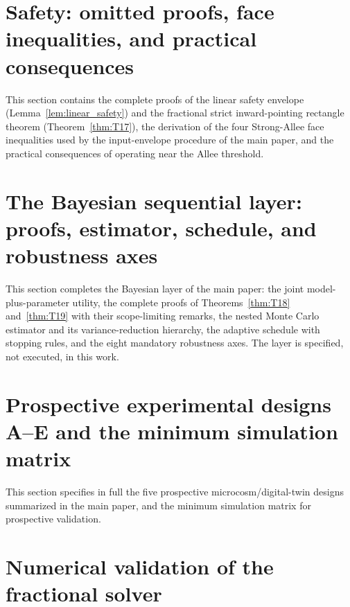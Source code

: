 \documentclass[9pt]{extarticle}
\begin{document}


\section{Safety: omitted proofs, face inequalities, and practical consequences}
\label{ssec:safety}

This section contains the complete proofs of the linear safety envelope
(Lemma~\ref{lem:linear_safety}) and the fractional strict inward-pointing rectangle theorem
(Theorem~\ref{thm:T17}), the derivation of the four Strong-Allee face inequalities used by
the input-envelope procedure of the main paper, and the practical consequences of operating
near the Allee threshold.



\section{The Bayesian sequential layer: proofs, estimator, schedule, and robustness axes}
\label{ssec:bayes}

This section completes the Bayesian layer of the main paper: the joint model-plus-parameter
utility, the complete proofs of Theorems~\ref{thm:T18} and~\ref{thm:T19} with their
scope-limiting remarks, the nested Monte Carlo estimator and its variance-reduction
hierarchy, the adaptive schedule with stopping rules, and the eight mandatory robustness
axes. The layer is specified, not executed, in this work.



\section{Prospective experimental designs A--E and the minimum simulation matrix}
\label{ssec:designs}

This section specifies in full the five prospective microcosm/digital-twin designs
summarized in the main paper, and the minimum simulation matrix for prospective validation.



\section{Numerical validation of the fractional solver}
\label{ssec:numval}





\end{document}
